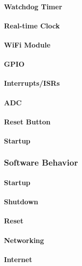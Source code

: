 \paragraph{Watchdog Timer}
\paragraph{Real-time Clock}
\paragraph{WiFi Module}
\paragraph{GPIO}
\paragraph{Interrupts/ISRs}
\paragraph{ADC}
\paragraph{Reset Button}
\paragraph{Startup}

\subsubsection{Software Behavior}
\paragraph{Startup}
\paragraph{Shutdown}
\paragraph{Reset}
\paragraph{Networking}
\paragraph{Internet}
